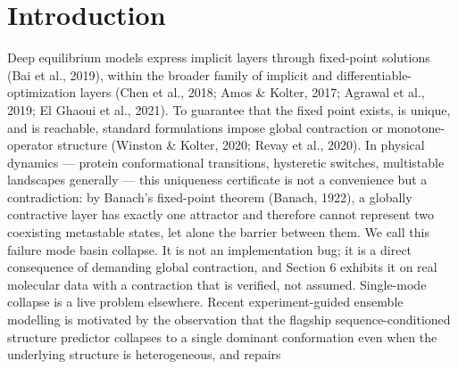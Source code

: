 \documentclass{article}
\begin{document}
\section{Introduction}
Deep equilibrium models express implicit layers through fixed-point solutions (Bai et al., 2019),
within the broader family of implicit and differentiable-optimization layers (Chen et al., 2018; Amos
\& Kolter, 2017; Agrawal et al., 2019; El Ghaoui et al., 2021). To guarantee that the fixed point
exists, is unique, and is reachable, standard formulations impose global contraction or monotone-
operator structure (Winston \& Kolter, 2020; Revay et al., 2020). In physical dynamics --- protein
conformational transitions, hysteretic switches, multistable landscapes generally --- this uniqueness
certificate is not a convenience but a contradiction: by Banach's fixed-point theorem (Banach, 1922),
a globally contractive layer has exactly one attractor and therefore cannot represent two coexisting
metastable states, let alone the barrier between them. We call this failure mode basin collapse.
It is not an implementation bug; it is a direct consequence of demanding global contraction, and
Section 6 exhibits it on real molecular data with a contraction that is verified, not assumed.
Single-mode collapse is a live problem elsewhere. Recent experiment-guided ensemble modelling
is motivated by the observation that the flagship sequence-conditioned structure predictor collapses
to a single dominant conformation even when the underlying structure is heterogeneous, and repairs
\clearpage

\end{document}
